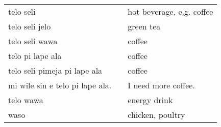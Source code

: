\begin{supertabular}{p{4,5cm}|ll}
    telo seli                       &  & hot beverage, e.g. coffee                              \\
    telo seli jelo                  &  & green tea                                              \\
    telo seli wawa                  &  & coffee                                                 \\
    telo pi lape ala                &  & coffee                                                 \\
    telo seli pimeja pi lape ala    &  & coffee                                                 \\
    mi wile sin e telo pi lape ala. &  & I need more coffee.                                    \\
    telo wawa                       &  & energy drink                                           \\
    waso                            &  & chicken, poultry                                       \\
\end{supertabular} \\
%
%
